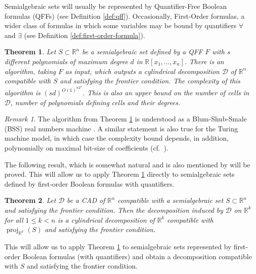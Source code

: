 \documentclass[
]{book}
\newtheorem{theorem}{Theorem}[chapter]
\theoremstyle{definition}
\theoremstyle{definition}
\theoremstyle{definition}
\theoremstyle{definition}
\theoremstyle{remark}
\newtheorem*{remark}{Remark}
\begin{document}
Semialgebraic sets will usually be represented by Quantifier-Free Boolean formulas (QFFs) (see Definition \ref{def:qff}).
Occasionally, First-Order formulas, a wider class of formulas in which some variables may be bound by quantifiers \(\forall\) and \(\exists\) (see Definition \ref{def:first-order-formula}).

\begin{theorem}
\protect\hypertarget{thm:main}{}\label{thm:main}Let \(S \subset \mathbb{R}^n\) be a semialgebraic set defined by a QFF \(F\) with \(s\) different polynomials of maximum degree \(d\) in \(\mathbb{R}[x_1,\ldots,x_n]\).
There is an algorithm, taking \(F\) as input, which outputs a cylindrical decomposition \(\mathcal D\) of \(\mathbb{R}^n\) compatible with \(S\) and
satisfying the frontier condition.
The complexity of this algorithm is \((sd)^{O(1)^{n2^n}}\).
This is also an upper bound on the number of cells in \(\mathcal D\), number of polynomials defining cells and their degrees.
\end{theorem}

\begin{remark}
The algorithm from Theorem \ref{thm:main} is understood as a Blum-Shub-Smale (BSS) real numbers machine \citep{blum1998}.
A similar statement is also true for the Turing machine model, in which case the complexity bound
depends, in addition, polynomially on maximal bit-size of coefficients (cf.~\citet{collins1975}).
\end{remark}

The following result, which is somewhat natural and is also mentioned by \citet{bgv15} will be proved. This will allow us to apply Theorem \ref{thm:main} directly to semialgebraic sets defined by first-order Boolean formulas with quantifiers.

\begin{theorem}
\protect\hypertarget{thm:proj}{}\label{thm:proj}Let \(\mathcal{D}\) be a CAD of \(\mathbb{R}^n\) compatible with a semialgebraic set \(S\subset \mathbb{R}^n\) and satisfying the frontier condition.
Then the decomposition induced by \(\mathcal{D}\) on \(\mathbb{R}^{k}\) for all \(1\le k < n\) is a cylindrical decomposition of \(\mathbb{R}^k\) compatible with \(\operatorname{proj}_{\mathbb{R}^k}(S)\) and satisfying the frontier condition.
\end{theorem}

This will allow us to apply Theorem \ref{thm:main} to semialgebraic sets represented by first-order Boolean formulas (with quantifiers) and obtain a decomposition compatible with \(S\) and satisfying the frontier condition.
\end{document}
